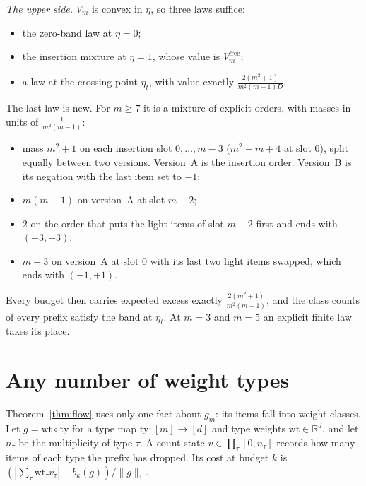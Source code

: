 \documentclass[conference]{IEEEtran}
\theoremstyle{definition}
\begin{document}
\emph{The upper side.} $V_{m}$ is convex in $\eta$, so three laws suffice:
\begin{itemize}
\item the zero-band law at $\eta=0$;
\item the insertion mixture at $\eta=1$, whose value is $V^{\mathrm{free}}_{m}$;
\item a law at the crossing point $\eta_{t}$, with value exactly
$\frac{2(m^{2}+1)}{m^{2}(m-1)D}$.
\end{itemize}
The last law is new. For $m\ge7$ it is a mixture of explicit orders, with masses in units of
$\frac{1}{m^{2}(m-1)}$:
\begin{itemize}
\item mass $m^{2}+1$ on each insertion slot $0,\dots,m-3$ ($m^{2}-m+4$ at slot $0$), split
equally between two versions. Version~A is the insertion order. Version~B is its negation
with the last item set to $-1$;
\item $m(m-1)$ on version~A at slot $m-2$;
\item $2$ on the order that puts the light items of slot $m-2$ first and ends with
$(-3,+3)$;
\item $m-3$ on version~A at slot $0$ with its last two light items swapped, which ends with
$(-1,+1)$.
\end{itemize}
Every budget then carries expected excess exactly $\frac{2(m^{2}+1)}{m^{2}(m-1)}$, and the
class counts of every prefix satisfy the band at $\eta_{t}$. At $m=3$ and $m=5$ an explicit
finite law takes its place.

\section{Any number of weight types}
\label{sec:typed}

Theorem~\ref{thm:flow} uses only one fact about $g_m$: its items fall into weight classes. Let
$g=\mathrm{wt}\circ\mathrm{ty}$ for a type map $\mathrm{ty}:[m]\to[d]$ and type weights
$\mathrm{wt}\in\mathbb R^d$, and let $n_\tau$ be the multiplicity of type $\tau$. A count state
$v\in\prod_\tau[0,n_\tau]$ records how many items of each type the prefix has dropped. Its cost
at budget $k$ is $(|\sum_\tau\mathrm{wt}_\tau v_\tau|-b_k(g))/\|g\|_1$.
\end{document}

